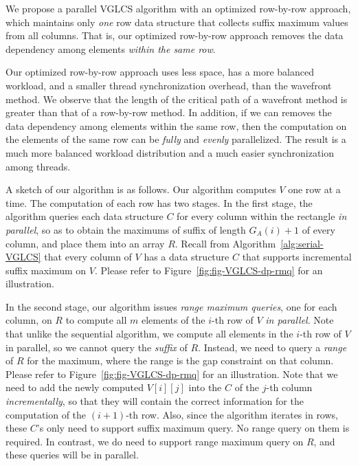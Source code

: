 We propose a parallel VGLCS algorithm with an optimized row-by-row
approach, which maintains only {\em one} row data structure that
collects suffix maximum values from all columns.  That is, our
optimized row-by-row approach removes the data dependency among
elements {\em within the same row}.

Our optimized row-by-row approach uses less space, has a more balanced
workload, and a smaller thread synchronization overhead, than the
wavefront method.  We observe that the length of the critical path of
a wavefront method is greater than that of a row-by-row method.  In
addition, if we can removes the data dependency among elements within
the same row, then the computation on the elements of the same row can
be {\em fully} and {\em evenly} parallelized.  The result is a much
more balanced workload distribution and a much easier synchronization
among threads.





A sketch of our algorithm is as follows.  Our algorithm computes $V$ one
row at a time.  The computation of each row has two stages.  In the
first stage, the algorithm queries each data structure $C$ for every
column within the rectangle {\em in parallel}, so as to obtain the
maximums of suffix of length $G_A(i) + 1$ of every column, and place
them into an array $R$. Recall from Algorithm~\ref{alg:serial-VGLCS}
that every column of $V$ has a data structure $C$ that supports
incremental suffix maximum on $V$.  Please refer to
Figure~\ref{fig:fig-VGLCS-dp-rmq} for an illustration.

In the second stage, our algorithm issues {\em range maximum queries},
one for each column, on $R$ to compute all $m$ elements of the $i$-th
row of $V$ {\em in parallel}.  Note that unlike the sequential
algorithm, we compute all elements in the $i$-th row of $V$ in parallel,
so we cannot query the {\em suffix} of $R$.  Instead, we need to query a
{\em range} of $R$ for the maximum, where the range is the gap
constraint on that column.  Please refer to
Figure~\ref{fig:fig-VGLCS-dp-rmq} for an illustration.  Note that we
need to add the newly computed $V[i][j]$ into the $C$ of the $j$-th
column {\em incrementally}, so that they will contain the correct
information for the computation of the $(i+1)$-th row.  Also, since the
algorithm iterates in rows, these $C$'s only need to support suffix
maximum query.  No range query on them is required.  In contrast, we do
need to support range maximum query on $R$, and these queries will be in
parallel.

